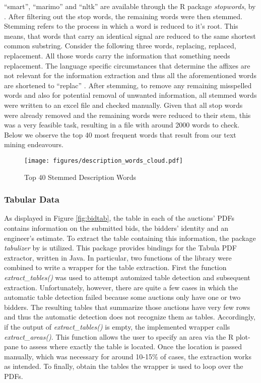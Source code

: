 \documentclass[a4paper,12pt, headsepline]{scrartcl}
\numberwithin{equation}{section}
\begin{document}
 \enquote{smart}, \enquote{marimo} and \enquote{nltk} are available through the R package \textit{stopwords}, by \citet{stopwords}. After filtering out the stop words, the remaining words were then stemmed. Stemming refers to the process in which a word is reduced to it's root. This means, that words that carry an identical signal are reduced to the same shortest common substring. Consider the following three words, replacing, replaced, replacement. All those words carry the information that something needs replacement. The language specific circumstances that determine the affixes are not relevant for the information extraction and thus all the aforementioned words are shortened to \enquote{replac} \citet{textminingR}. After stemming, to remove any remaining misspelled words and also for potential removal of unwanted information, all stemmed words were written to an excel file and checked manually. Given that all stop words were already removed and the remaining words were reduced to their stem, this was a very feasible task, resulting in a file with around 2000 words to check. Below we observe the top 40 most frequent words that result from our text mining endeavours.
 
\begin{figure}[H]
	\texttt{[image: figures/description\_words\_cloud.pdf]}
	\caption{Top 40 Stemmed Description Words}\label{fig:desc}
\end{figure}

\subsubsection{Tabular Data}\label{subsec:tab}

As displayed in Figure \ref{fig:bidtab}, the table in each of the auctions' PDFs contains information on the submitted bids, the bidders' identity and an engineer's estimate. To extract the table containing this information, the package \textit{tabulizer} by \citet{tabulizer} is utilized. This package provides bindings for the Tabula PDF extractor, written in Java. In particular, two functions of the library were combined to write a wrapper for the table extraction. First the function \textit{extract\_tables()} was used to attempt automized table detection and subsequent extraction. Unfortunately, however, there are quite a few cases in which the automatic table detection failed because some auctions only have one or two bidders. The resulting tables that summarize those auctions have very few rows and thus the automatic detection does not recognize them as tables. Accordingly, if the output of \textit{extract\_tables()} is empty, the implemented wrapper calls \textit{extract\_areas()}. This function allows the user to specify an area via the R plot-pane to assess where exactly the table is located. Once the location is passed manually, which was necessary for around 10-15\% of cases, the extraction works as intended. To finally, obtain the tables the wrapper is used to loop over the PDFs.
\end{document}
